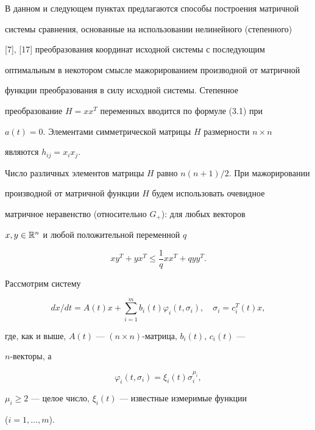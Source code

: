  


В данном и следующем пунктах предлагаются способы построения матричной 


системы сравнения, основанные на использовании нелинейного (степенного) 


[7], [17] преобразования координат исходной системы с последующим 


оптимальным в некотором смысле мажорированием производной от матричной 


функции преобразования в силу исходной системы. Степенное 


преобразование $H=x x^T$ переменных вводится по формуле (3.1) при 


$a(t)=0$. Элементами симметрической матрицы $H$ размерности $n\times n$ 


являются $h_{ij}=x_i x_j$. 


Число различных элементов матрицы $H$ равно $n(n+1)/2$. При мажорировании 


производной от матричной функции $H$ будем использовать очевидное 


матричное неравенство (относительно $G_+$): для любых векторов 


$x,y\in \Bbb R^n$ и любой положительной переменной $q$ 


\begin{equation} 


x y^T+y x^T\le\frac{1}{q}x x^T+q y y^T. 


\end{equation} 


 


Рассмотрим систему 


\begin{equation} 


d x/d t=A(t)x+\sum^m_{i=1}b_i(t)\varphi_i(t,\sigma_i),\quad 


\sigma_i=c^T_i(t)x, 


\end{equation} 


где, как и выше, $A(t)$ --- $(n\times n)$-матрица, $b_i(t)$, $c_i(t)$ --- 


$n$-векторы, а 


$$ 


\varphi_i(t,\sigma_i)=\xi_i(t)\sigma^{\mu_i}_i, 


$$ 


$\mu_i\ge2$ --- целое число, $\xi_i(t)$ --- известные измеримые функции 


($i=1,\dotsc,m$). 


